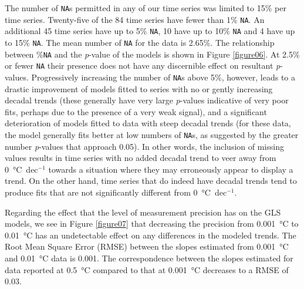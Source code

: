 \documentclass[]{ametsoc}
\begin{document}
The number of \texttt{NA}s permitted in any of our time series was limited to 15\% per time series. Twenty-five of the 84 time series have fewer than 1\% \texttt{NA}. An additional 45 time series have up to 5\% \texttt{NA}, 10 have up to 10\% \texttt{NA} and 4 have up to 15\% \texttt{NA}. The mean number of \texttt{NA} for the data is 2.65\%. The relationship between \%\texttt{NA} and the \emph{p}-value of the models is shown in Figure \ref{figure06}. At 2.5\% or fewer \texttt{NA} their presence does not have any discernible effect on resultant \emph{p}-values. Progressively increasing the number of \texttt{NA}s above 5\%, however, leads to a drastic improvement of models fitted to series with no or gently increasing decadal trends (these generally have very large \emph{p}-values indicative of very poor fits, perhaps due to the presence of a very weak signal), and a significant deterioration of models fitted to data with steep decadal trends (for these data, the model generally fits better at low numbers of \texttt{NA}s, as suggested by the greater number \emph{p}-values that approach 0.05). In other words, the inclusion of missing values results in time series with no added decadal trend to veer away from \SI{0}{\degreeCelsius}~dec$^{-1}$ towards a situation where they may erroneously appear to display a trend. On the other hand, time series that do indeed have decadal trends tend to produce fits that are not significantly different from \SI{0}{\degreeCelsius}~dec$^{-1}$.

Regarding the effect that the level of measurement precision has on the GLS models, we see in Figure \ref{figure07} that decreasing the precision from \SI{0.001}{\degreeCelsius} to \SI{0.01}{\degreeCelsius} has an undetectable effect on any differences in the modeled trends. The Root Mean Square Error (RMSE) between the slopes estimated from \SI{0.001}{\degreeCelsius} and \SI{0.01}{\degreeCelsius} data is 0.001. The correspondence between the slopes estimated for data reported at \SI{0.5}{\degreeCelsius} compared to that at \SI{0.001}{\degreeCelsius} decreases to a RMSE of 0.03.
\end{document}
